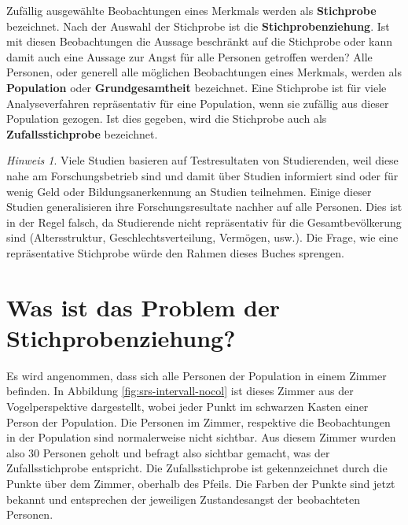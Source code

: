 \documentclass[
]{book}
\theoremstyle{definition}
\theoremstyle{definition}
\theoremstyle{definition}
\theoremstyle{definition}
\theoremstyle{remark}
\newtheorem*{remark}{Hinweis}
\begin{document}
\label{customdef-stichprobe}{Zufällig ausgewählte Beobachtungen eines Merkmals werden als \textbf{Stichprobe} bezeichnet.} \label{customdef-stichprobenziehung}{Nach der Auswahl der Stichprobe ist die \textbf{Stichprobenziehung}.} Ist mit diesen Beobachtungen die Aussage beschränkt auf die Stichprobe oder kann damit auch eine Aussage zur Angst für alle Personen getroffen werden? \label{customdef-population}{Alle Personen, oder generell alle möglichen Beobachtungen eines Merkmals, werden als \textbf{Population}} \label{customdef-grundgesamtheit}{oder \textbf{Grundgesamtheit} bezeichnet}. \label{customdef-zufallsstichprobe}{Eine Stichprobe ist für viele Analyseverfahren repräsentativ für eine Population, wenn sie zufällig aus dieser Population gezogen. Ist dies gegeben, wird die Stichprobe auch als \textbf{Zufallsstichprobe} bezeichnet.}

\begin{remark}
Viele Studien basieren auf Testresultaten von Studierenden, weil diese nahe am Forschungsbetrieb sind und damit über Studien informiert sind oder für wenig Geld oder Bildungsanerkennung an Studien teilnehmen. Einige dieser Studien generalisieren ihre Forschungsresultate nachher auf alle Personen. Dies ist in der Regel falsch, da Studierende nicht repräsentativ für die Gesamtbevölkerung sind (Altersstruktur, Geschlechtsverteilung, Vermögen, usw.). Die Frage, wie eine repräsentative Stichprobe würde den Rahmen dieses Buches sprengen.
\end{remark}

\section{Was ist das Problem der Stichprobenziehung?}\label{stichprobenziehung-problem}

Es wird angenommen, dass sich alle Personen der Population in einem Zimmer befinden. In Abbildung \ref{fig:srs-intervall-nocol} ist dieses Zimmer aus der Vogelperspektive dargestellt, wobei jeder Punkt im schwarzen Kasten einer Person der Population. Die Personen im Zimmer, respektive die Beobachtungen in der Population sind normalerweise nicht sichtbar. Aus diesem Zimmer wurden also 30 Personen geholt und befragt also sichtbar gemacht, was der Zufallsstichprobe entspricht. Die Zufallsstichprobe ist gekennzeichnet durch die Punkte über dem Zimmer, oberhalb des Pfeils. Die Farben der Punkte sind jetzt bekannt und entsprechen der jeweiligen Zustandesangst der beobachteten Personen.
\end{document}
